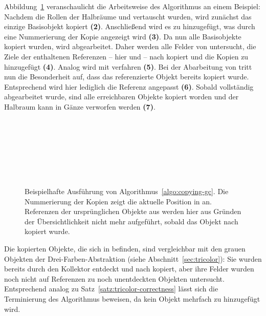 Abbildung~\ref{fig:fenichel-example} veranschaulicht die Arbeitsweise des Algorithmus an einem Beispiel:
Nachdem die Rollen der Halbräume  und  vertauscht wurden, wird zunächst das einzige Basisobjekt  kopiert \textbf{(2)}.
Anschließend wird es zu  hinzugefügt, was durch eine Nummerierung der Kopie  angezeigt wird \textbf{(3)}.
Da nun alle Basisobjekte kopiert wurden, wird  abgearbeitet.
Daher werden alle Felder von  untersucht, die Ziele der enthaltenen Referenzen -- hier  und  -- nach  kopiert und die Kopien zu  hinzugefügt \textbf{(4)}.
Analog wird mit  verfahren \textbf{(5)}.
Bei der Abarbeitung von  tritt nun die Besonderheit auf, dass das referenzierte Objekt  bereits kopiert wurde.
Entsprechend wird hier lediglich die Referenz angepasst \textbf{(6)}.
Sobald  vollständig abgearbeitet wurde, sind alle erreichbaren Objekte kopiert worden und der Halbraum  kann in Gänze verworfen werden \textbf{(7)}.

\newpage

\begin{figure}[h!]
	\centering
	\\[0.5cm]
	\\[0.5cm]
	\\[0.5cm]
	\\[0.5cm]
	\\[0.5cm]
	\\[0.5cm]
	
	\caption[Ausführung der kopierenden Garbage Collection]{Beispielhafte Ausführung von Algorithmus~\ref{algo:copying-gc}. Die Nummerierung der Kopien zeigt die aktuelle Position in  an. Referenzen der ursprünglichen Objekte aus  werden hier aus Gründen der Übersichtlichkeit nicht mehr aufgeführt, sobald das Objekt nach  kopiert wurde.}
	\label{fig:fenichel-example}
\end{figure}

Die kopierten Objekte, die sich in  befinden, sind vergleichbar mit den grauen Objekten der Drei-Farben-Abstraktion (siehe Abschnitt~\ref{sec:tricolor}):
Sie wurden bereits durch den Kollektor entdeckt und nach  kopiert, aber ihre Felder wurden noch nicht auf Referenzen zu noch unentdeckten Objekten untersucht.
Entsprechend analog zu Satz~\ref{satz:tricolor-correctness} lässt sich die Terminierung des Algorithmus beweisen, da kein Objekt mehrfach zu  hinzugefügt wird.

